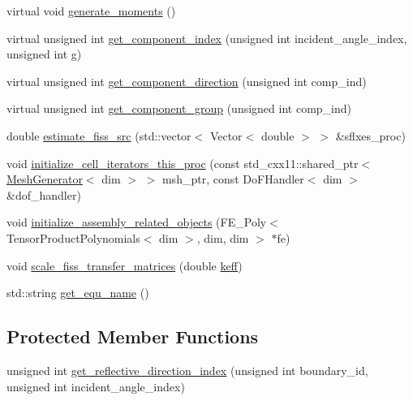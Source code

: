 \begin{DoxyCompactItemize}
\item 
virtual void \hyperlink{class_equation_base_ab74a0a15d0d2a20022cafad8dd6f46aa}{generate\+\_\+moments} ()
\item 
virtual unsigned int \hyperlink{class_equation_base_a03a5a22088edb15689e0041dcc6d323c}{get\+\_\+component\+\_\+index} (unsigned int incident\+\_\+angle\+\_\+index, unsigned int g)
\item 
virtual unsigned int \hyperlink{class_equation_base_a4feaa86bdd6e84c4fc9195df67890c6a}{get\+\_\+component\+\_\+direction} (unsigned int comp\+\_\+ind)
\item 
virtual unsigned int \hyperlink{class_equation_base_a43a783f117149eac90a770d471cd7671}{get\+\_\+component\+\_\+group} (unsigned int comp\+\_\+ind)
\item 
double \hyperlink{class_equation_base_a1f36aebd8d54a082db3b2d2a621e67d6}{estimate\+\_\+fiss\+\_\+src} (std\+::vector$<$ Vector$<$ double $>$ $>$ \&sflxes\+\_\+proc)
\item 
void \hyperlink{class_equation_base_a4268bd83e1858fb6326c9b67851e85cc}{initialize\+\_\+cell\+\_\+iterators\+\_\+this\+\_\+proc} (const std\+\_\+cxx11\+::shared\+\_\+ptr$<$ \hyperlink{class_mesh_generator}{Mesh\+Generator}$<$ dim $>$ $>$ msh\+\_\+ptr, const Do\+F\+Handler$<$ dim $>$ \&dof\+\_\+handler)
\item 
void \hyperlink{class_equation_base_a932c91c91d2b758a155548e5b20ed1ff}{initialize\+\_\+assembly\+\_\+related\+\_\+objects} (F\+E\+\_\+\+Poly$<$ Tensor\+Product\+Polynomials$<$ dim $>$, dim, dim $>$ $\ast$fe)
\item 
void \hyperlink{class_equation_base_a13947db6be48085b9dca97117c73b5ca}{scale\+\_\+fiss\+\_\+transfer\+\_\+matrices} (double \hyperlink{class_equation_base_ab3cf94dc329f486555f89bdb0dd94ed6}{keff})
\item 
std\+::string \hyperlink{class_equation_base_abc4842a38ebb180b57ae11ec1325535c}{get\+\_\+equ\+\_\+name} ()
\end{DoxyCompactItemize}
\subsection*{Protected Member Functions}
\begin{DoxyCompactItemize}
\item 
unsigned int \hyperlink{class_equation_base_a7c46fc281a4040a89bbd97ccf0f46ac7}{get\+\_\+reflective\+\_\+direction\+\_\+index} (unsigned int boundary\+\_\+id, unsigned int incident\+\_\+angle\+\_\+index)
\end{DoxyCompactItemize}
